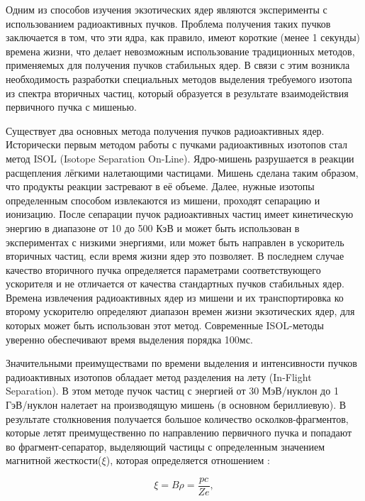 Одним из способов изучения экзотических ядер являются эксперименты с использованием радиоактивных пучков. Проблема получения таких пучков заключается в том, что эти ядра, как правило,  имеют короткие (менее 1 секунды) времена жизни, что делает невозможным использование традиционных методов, применяемых для получения пучков стабильных ядер. В связи с этим возникла необходимость разработки специальных методов выделения требуемого изотопа из спектра вторичных частиц, который образуется в результате взаимодействия первичного пучка с мишенью.

Существует два основных метода получения пучков радиоактивных ядер.
Исторически первым методом работы с пучками радиоактивных изотопов стал метод ISOL (Isotope Separation On-Line)\cite{ufn}. Ядро-мишень разрушается в реакции расщепления лёгкими налетающими частицами. Мишень сделана таким образом, что продукты реакции застревают в её объеме. Далее, нужные изотопы определенным способом извлекаются из мишени, проходят сепарацию и ионизацию. После сепарации пучок радиоактивных частиц имеет кинетическую энергию в диапазоне от 10 до 500 КэВ и может быть использован в экспериментах с низкими энергиями, или может быть направлен в ускоритель вторичных частиц, если время жизни ядер это позволяет. В последнем случае качество вторичного пучка определяется параметрами соответствующего ускорителя и не отличается от качества стандартных пучков стабильных ядер. Времена извлечения радиоактивных ядер из мишени и их транспортировка ко второму ускорителю определяют диапазон времен жизни экзотических ядер, для которых может быть использован этот метод. Современные ISOL-методы уверенно обеспечивают время выделения порядка 100мс\cite{ufn}. 

Значительными преимуществами по времени выделения и интенсивности пучков радиоактивных изотопов обладает метод разделения на лету (In-Flight Separation). В этом методе пучок частиц с энергией от 30 МэВ/нуклон до 1 ГэВ/нуклон налетает на производящую мишень (в основном бериллиевую). В результате столкновения получается большое количество осколков-фрагментов, которые летят преимущественно по направлению первичного пучка и попадают во фрагмент-сепаратор, выделяющий частицы с определенным значением магнитной жесткости($\xi$), которая определяется отношением :

\begin{equation}
\label{Mag}
\xi = B \rho =  \frac{pc}{Ze},
\end{equation}

